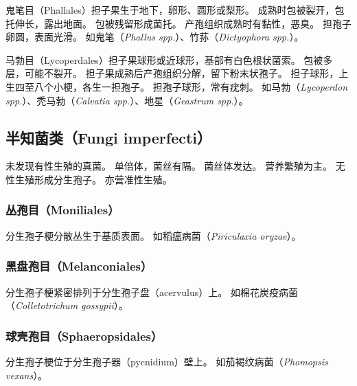\documentclass[11pt]{article}
\begin{document}
\newline

鬼笔目（Phallales）担子果生于地下，卵形、圆形或梨形。
成熟时包被裂开，包托伸长，露出地面。
包被残留形成菌托。
产孢组织成熟时有黏性，恶臭。
担孢子卵圆，表面光滑。
如鬼笔（\textit{Phallus spp.}）、竹荪（\textit{Dictyophora spp.}）。

\newline

马勃目（Lycoperdales）担子果球形或近球形，基部有白色根状菌索。
包被多层，可能不裂开。
担子果成熟后产孢组织分解，留下粉末状孢子。
担子球形，上生四至八个小梗，各生一担孢子。
担孢子球形，常有疣刺。
如马勃（\textit{Lycoperdon spp.}）、秃马勃（\textit{Calvatia spp.}）、地星（\textit{Geastrum spp.}）。

\subsection{半知菌类（Fungi imperfecti）}
未发现有性生殖的真菌。
单倍体，菌丝有隔。
菌丝体发达。
营养繁殖为主。
无性生殖形成分生孢子。
亦营准性生殖。

\subsubsection{丛孢目（Moniliales）}
分生孢子梗分散丛生于基质表面。
如稻瘟病菌（\textit{Piriculaxia oryzae}）。

\subsubsection{黑盘孢目（Melanconiales）}
分生孢子梗紧密排列于分生孢子盘（acervulus）上。
如棉花炭疫病菌（\textit{Colletotrichum gossypii}）。

\subsubsection{球壳孢目（Sphaeropsidales）}
分生孢子梗位于分生孢子器（pycnidium）壁上。
如茄褐纹病菌（\textit{Phomopsis vexans}）。
\end{document}
